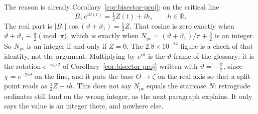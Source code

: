 \documentclass[11pt]{article}
\theoremstyle{definition}
\begin{document}
The reason is already Corollary~\ref{cor:bisector-proj}: on the critical line
\begin{equation}\label{eq:B1-rotated}
B_1\,e^{i\vartheta(t)}=\tfrac12 Z(t)+ih,\qquad h\in\mathbb R.
\end{equation}
The real part is
$\lvert B_1\rvert\cos(\vartheta+\vartheta_1)=\tfrac12 Z$.
That cosine is zero exactly when
$\vartheta+\vartheta_1\equiv\tfrac\pi2\pmod\pi$, which is exactly when
$N_{\mathrm{ps}}=(\vartheta+\vartheta_1)/\pi+\tfrac32$ is an integer.
So $N_{\mathrm{ps}}$ is an integer if and only if $Z=0$.
The $2.8\times10^{-14}$ figure is a check of that identity, not the
argument.
Multiplying by $e^{i\vartheta}$ is the $\vartheta$-frame of the glossary:
it is the rotation $e^{-i\psi/2}$ of Corollary~\ref{cor:bisector-proj}
written with $\vartheta=-\tfrac{\psi}{2}$, since $\chi=e^{-2i\vartheta}$
on the line, and it puts the base $O\to\zeta$ on the real axis so that a
split point reads as $\tfrac12 Z+ih$.
This does not say $N_{\mathrm{ps}}$ equals the staircase $N$: retrograde
ordinates still land on the wrong integer, as the next paragraph
explains. It only says the value is an integer there, and nowhere else.
\end{document}
